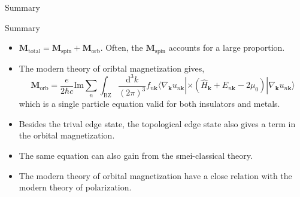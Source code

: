 \documentclass{beamer}
\begin{document}
    \begin{frame}{Summary}
    \begin{block}{Summary}
      \begin{itemize}
        \item \(\bm{M}_{\text{total}} = \bm{M}_{\text{spin}} + \bm{M}_{\text{orb}}\). Often, the \(\bm{M}_{\text{spin}}\) accounts for a large proportion.
        \item The modern theory of oribtal magnetization gives,
        \begin{equation*}
          \bm{M}_{\text{orb}} = \frac{e}{2\hbar{}c}\text{Im}\sum_n\int_{\text{BZ}}\frac{\mathrm{d}^3k}{(2\pi)^3}f_{n\bm{k}}\langle\nabla_{\bm{k}}u_{n\bm{k}}|\times(\widehat{H}_{\bm{k}}+E_{n\bm{k}}-2\mu_{0})|\nabla_{\bm{k}}u_{n\bm{k}}\rangle
        \end{equation*}
        which is a single particle equation valid for both insulators and metals.
        \item Besides the trival edge state, the topological edge state also gives a term in the orbital magnetization.
        \item The same equation can also gain from the smei-classical theory. 
        \item The modern theory of orbital magnetization have a close relation with the modern theory of polarization.
      \end{itemize}
    \end{block}
    \end{frame}
\end{document}
